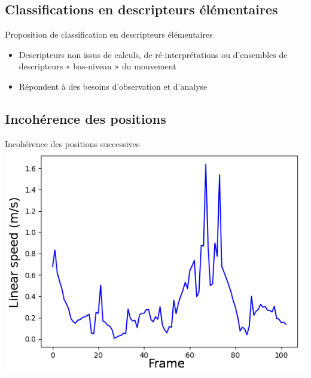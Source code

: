 \begin{frame}{\subsecname}
    \subsection{Classifications en descripteurs élémentaires}
    \begin{frame}{\subsecname}
    Proposition de classification en descripteurs élémentaires
        \begin{itemize}[label=$\bullet$]
            \item Descripteurs non issus de calculs, de ré-interprétations ou d'ensembles de descripteurs « bas-niveau » du mouvement
            \item Répondent à des besoins d'observation et d'analyse
        \end{itemize}
    \end{frame}
    
    \subsection{Incohérence des positions}
    \begin{frame}{Incohérence des positions successives}
    \centering
        \includegraphics[scale=0.7]{img/linear_speed_artifacts.png}
    \end{frame}
    

\end{frame}
